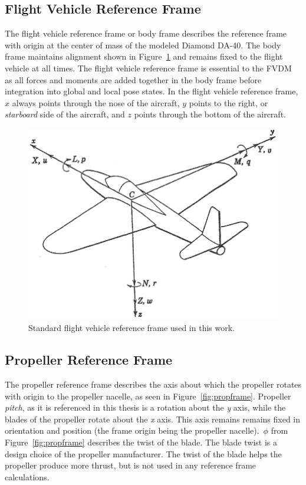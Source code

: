 \subsection{Flight Vehicle Reference Frame}\label{section:FVRF}
The flight vehicle reference frame or body frame describes the reference frame with origin at the center of mass of the modeled Diamond DA-40. The body frame maintains alignment shown in Figure~\ref{fig:flightvehiclereferenceframe} and remains fixed to the flight vehicle at all times. The flight vehicle reference frame is essential to the FVDM as all forces and moments are added together in the body frame before integration into global and local pose states. In the flight vehicle reference frame, \(x\) always points through the nose of the aircraft, \(y\) points to the right, or \textit{starboard} side of the aircraft, and \(z\) points through the bottom of the aircraft.

\begin{figure}[!ht]
    \centering
    \includegraphics[width=0.60\linewidth]{Figures/bodyframe.png}
    \caption{Standard flight vehicle reference frame used in this work.~\cite{peetSpacecraftAircraftDynamics}}\label{fig:flightvehiclereferenceframe}
\end{figure}
\clearpage
\subsection{Propeller Reference Frame}
The propeller reference frame describes the axis about which the propeller rotates with origin to the propeller nacelle, as seen in Figure~\ref{fig:propframe}. Propeller \textit{pitch}, as it is referenced in this thesis is a rotation about the \textit{y} axis, while the blades of the propeller rotate about the \textit{x} axis. This axis remains remains fixed in orientation and position (the frame origin being the propeller nacelle).~\( \phi{}\) from Figure~\ref{fig:propframe} describes the twist of the blade. The blade twist is a design choice of the propeller manufacturer. The twist of the blade helps the propeller produce more thrust, but is not used in any reference frame calculations.

